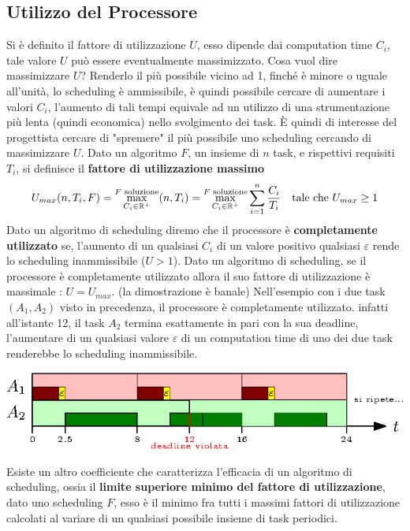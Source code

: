 \documentclass[10pt, letterpaper]{report}
\begin{document}
\subsection{Utilizzo del Processore}
Si è definito il fattore di utilizzazione $U$, esso dipende dai computation time $C_i$, 
tale valore $U$ può essere eventualmente massimizzato. Cosa vuol dire massimizzare $U$? Renderlo 
il più possibile vicino ad 1, finché è minore o uguale all'unità, lo scheduling è ammissibile, 
è quindi possibile cercare di aumentare i valori $C_i$, l'aumento di tali tempi equivale ad un 
utilizzo di una strumentazione più lenta (quindi economica) nello svolgimento dei task. È quindi di interesse 
del progettista cercare di "spremere" il più possibile uno scheduling cercando di massimizzare $U$.\acc 
Dato un algoritmo $F$, un insieme di $n$ task, e rispettivi requisiti $T_i$, si definisce il 
\textbf{fattore di utilizzazione massimo} 
$$ U_{max}(n,T_i,F)=\max_{C_i\in{\mathbb R}^+}^{F \text{ soluzione}}(n,T_i)=\max_{C_i\in{\mathbb R}^+}^{F \text{ soluzione}}\sum_{i=1}^n\frac{C_i}{T_i}  \ \ \text{ tale che }U_{max}\ge1 $$
 Dato un algoritmo di scheduling diremo che il processore è \textbf{completamente utilizzato} 
se, l'aumento di un qualsiasi $C_i$ di un valore positivo qualsiasi $\varepsilon$ rende lo scheduling 
inammissibile ($U>1$).\acc 
\prop{} Dato un algoritmo di scheduling, se il processore è completamente utilizzato allora il suo fattore 
di utilizzazione è massimale : $U=U_{max}$. (la dimostrazione è banale)\acc 
Nell'esempio con i due task $(A_1,A_2)$ visto in precedenza, il processore è completamente utilizzato. 
infatti all'istante 12, il task $A_2$ termina esattamente in pari con la sua deadline, l'aumentare di un 
qualsiasi valore $\varepsilon$ di un computation time di uno dei due task 
renderebbe lo scheduling inammissibile.\begin{center}
    \includegraphics[width=1\textwidth ]{images/schedulingCondtInamm.eps}
\end{center}
Esiste un altro coefficiente che caratterizza l'efficacia di un algoritmo di 
scheduling, ossia il \textbf{limite superiore minimo del fattore di utilizzazione}, 
dato uno scheduling $F$, esso è il minimo fra tutti i massimi fattori di utilizzazione calcolati 
al variare di un qualsiasi possibile insieme di task periodici.
\end{document}
